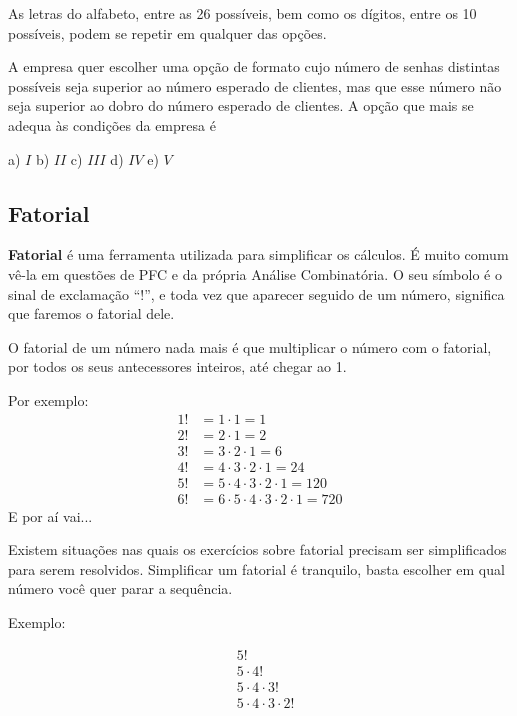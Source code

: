 \begin{multicols*}{2}
	As letras do alfabeto, entre as 26 possíveis, bem como os dígitos, entre os 10 possíveis, podem se repetir em qualquer das opções.

	A empresa quer escolher uma opção de formato cujo número de senhas distintas possíveis seja superior ao número esperado de clientes, mas que esse número não seja superior ao dobro do número esperado de clientes.
	A opção que mais se adequa às condições da empresa é

	a) $ I $ b) $II $ c) $III $ d) $IV $ e) $V $


	\subsection*{Fatorial}

	\textbf{Fatorial} é uma ferramenta utilizada para simplificar os cálculos. É muito comum vê-la em questões de PFC e da própria Análise Combinatória. O seu símbolo é o sinal de exclamação “!”, e toda vez que aparecer seguido de um número, significa que faremos o fatorial dele.

	O fatorial de um número nada mais é que multiplicar o número com o fatorial, por todos os seus antecessores inteiros, até chegar ao 1.

	Por exemplo:
	\begin{align*}
		1! & = 1 \cdot 1 = 1                                   \\
		2! & = 2 \cdot 1 =2                                    \\
		3! & = 3 \cdot 2 \cdot 1 = 6                           \\
		4! & = 4 \cdot 3 \cdot 2 \cdot 1 = 24                  \\
		5! & = 5 \cdot 4 \cdot 3 \cdot 2 \cdot 1 = 120         \\
		6! & = 6 \cdot 5 \cdot 4 \cdot 3 \cdot 2 \cdot 1 = 720
	\end{align*}
	E por aí vai...

	Existem situações nas quais os exercícios sobre fatorial precisam ser simplificados para serem resolvidos. Simplificar um fatorial é tranquilo, basta escolher em qual número você quer parar a sequência.

	Exemplo:

	\begin{align*}
		 & 5!                         \\
		 & 5 \cdot 4!                 \\
		 & 5 \cdot 4 \cdot 3!         \\
		 & 5 \cdot 4 \cdot 3 \cdot 2!
	\end{align*}


\end{multicols*}
